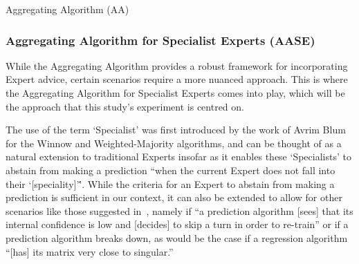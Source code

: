 \begin{algorithm}[H]
    \caption{Aggregating Algorithm (AA)}\label{algorithm:aggregationg_algorithm}
    \begin{algorithmic}[1]
    \end{algorithmic}
\end{algorithm}

\subsubsection{Aggregating Algorithm for Specialist Experts (AASE)}\label{subsubsection:aggregating_algorithm_for_specialist_experts}
While the Aggregating Algorithm provides a robust framework for incorporating Expert advice, certain scenarios require a more nuanced approach. This is where the Aggregating Algorithm for Specialist Experts comes into play, which will be the approach that this study's experiment is centred on.

The use of the term `Specialist' was first introduced by the work of Avrim Blum~\cite{blum:1997} for the Winnow and Weighted-Majority algorithms, and can be thought of as a natural extension to traditional Experts insofar as it enables these `Specialists' to abstain from making a prediction ``when the current Expert does not fall into their `[speciality]'\''. While the criteria for an Expert to abstain from making a prediction is sufficient in our context, it can also be extended to allow for other scenarios like those suggested in~\cite{kalnishkan:2022}, namely if ``a prediction algorithm [sees] that its internal confidence is low and [decides] to skip a turn in order to re-train'' or if a prediction algorithm breaks down, as would be the case if a regression algorithm ``[has] its matrix very close to singular.''

